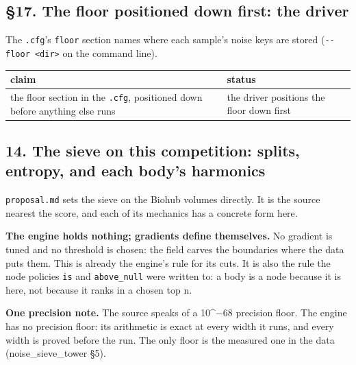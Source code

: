 \subsection{\texorpdfstring{§17. The floor positioned down first: the driver}{§17. The floor positioned down first: the driver}}

The \texttt{.\allowbreak{}cfg}'s \texttt{floor} section names where each sample's noise keys are stored (\texttt{-\allowbreak{}-\allowbreak{}floor <dir>} on the command line).

{\small
\setlength{\tabcolsep}{6pt}
\begin{longtable}{>{\RaggedRight\arraybackslash}p{}>{\RaggedRight\arraybackslash}p{}}
\toprule
claim & status \\
\midrule
\endhead
the floor section in the \texttt{.\allowbreak{}cfg}, positioned down before anything else runs & the driver positions the floor down first \\
\bottomrule
\end{longtable}
}

\subsection{\texorpdfstring{14. The sieve on this competition: splits, entropy, and each body's harmonics}{14. The sieve on this competition: splits, entropy, and each body's harmonics}}

\texttt{proposal.\allowbreak{}md} sets the sieve on the Biohub volumes directly. It is the source nearest the score, and each of its mechanics has a concrete form here.

\textbf{The engine holds nothing; gradients define themselves.} No gradient is tuned and no threshold is chosen: the field carves the boundaries where the data puts them. This is already the engine's rule for its cuts. It is also the rule the node policies \texttt{is} and \texttt{above\_\allowbreak{}null} were written to: a body is a node because it is here, not because it ranks in a chosen top n.

\textbf{One precision note.} The source speaks of a 10\textasciicircum{}−68 precision floor. The engine has no precision floor: its arithmetic is exact at every width it runs, and every width is proved before the run. The only floor is the measured one in the data (noise\_\allowbreak{}sieve\_\allowbreak{}tower §5).

